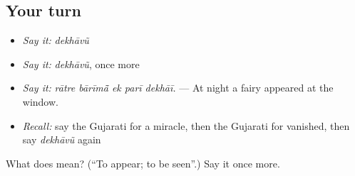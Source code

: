\subsection*{Your turn}
\begin{itemize}
\raggedright
  \item \emph{Say it:} \emph{dekhāvũ}
  \item \emph{Say it:} \emph{dekhāvũ}, once more
  \item \emph{Say it:} \emph{rātre bārīmā̃ ek parī dekhāī.} — At night a fairy appeared at the window.
  \item \emph{Recall:} say the Gujarati for a miracle, then the Gujarati for vanished, then say \emph{dekhāvũ} again
\end{itemize}

\begin{tcolorbox}[breakable,colback=teal!4,colframe=teal!35!black,title={Before you move on}]
What does  mean? (\textquotedblleft{}To appear; to be seen\textquotedblright{}.) Say it once more.
\end{tcolorbox}
